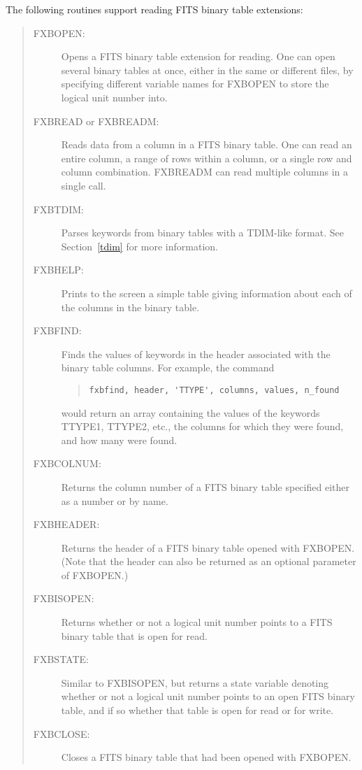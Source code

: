 The following routines support reading FITS binary table extensions:
\begin{quote}
\begin{description}
\item[FXBOPEN:]
Opens a FITS binary table extension for reading.  One can open several binary
tables at once, either in the same or different files, by specifying different
variable names for FXBOPEN to store the logical unit number into.
\item[FXBREAD or FXBREADM:]
Reads data from a column in a FITS binary table.  One can read an entire
column, a range of rows within a column, or a single row and column
combination.  FXBREADM can read multiple columns in a single call.
\item[FXBTDIM:]
Parses keywords from binary tables with a TDIM-like format.  See
Section~\ref{tdim} for more information.
\item[FXBHELP:]
Prints to the screen a simple table giving information about each of the
columns in the binary table.
\item[FXBFIND:]
Finds the values of keywords in the header associated with the binary table
columns.  For example, the command
\begin{quote}
\begin{verbatim}
fxbfind, header, 'TTYPE', columns, values, n_found
\end{verbatim}
\end{quote}
would return an array containing the values of the keywords TTYPE1, TTYPE2,
etc., the columns for which they were found, and how many were found.
\item[FXBCOLNUM:]
Returns the column number of a FITS binary table specified either as a number
or by name.
\item[FXBHEADER:]
Returns the header of a FITS binary table opened with FXBOPEN.  (Note that the
header can also be returned as an optional parameter of FXBOPEN.)
\item[FXBISOPEN:]
Returns whether or not a logical unit number points to a FITS binary table that
is open for read.
\item[FXBSTATE:]
Similar to FXBISOPEN, but returns a state variable denoting whether or not a
logical unit number points to an open FITS binary table, and if so whether that
table is open for read or for write.
\item[FXBCLOSE:]
Closes a FITS binary table that had been opened with FXBOPEN.
\end{description}
\end{quote}

